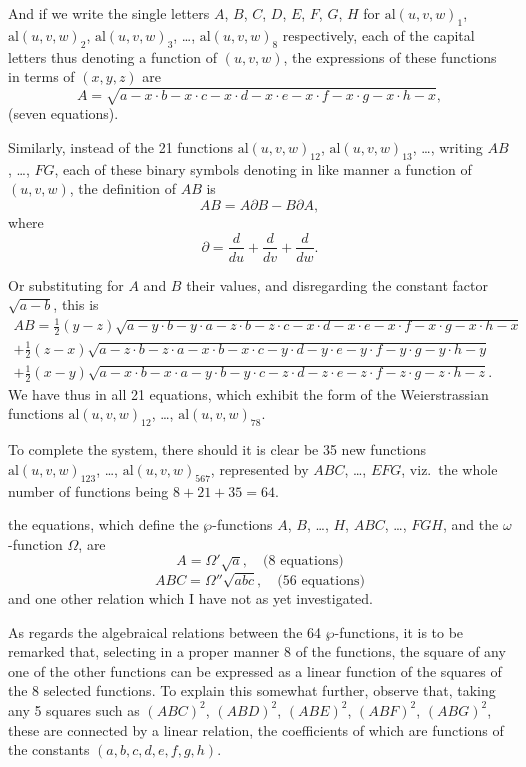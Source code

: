 \documentclass[11pt,a4paper]{book}
\begin{document}
And if we write the single letters $A$, $B$, $C$, $D$, $E$, $F$, $G$, $H$ for $\mathrm{al}(u, v, w)_1$, $\mathrm{al}(u, v, w)_2$, $\mathrm{al}(u, v, w)_3$, \dots, $\mathrm{al}(u, v, w)_8$ respectively, each of the capital letters thus denoting a function of $(u, v, w)$, the expressions of these functions in terms of $(x, y, z)$ are
\[
A = \sqrt{a - x \cdot b - x \cdot c - x \cdot d - x \cdot e - x \cdot f - x \cdot g - x \cdot h - x},
\]
(seven equations).

\clearpage
Similarly, instead of the 21 functions $\mathrm{al}(u, v, w)_{12}$, $\mathrm{al}(u, v, w)_{13}$, \dots, writing $AB$, \dots, $FG$, each of these binary symbols denoting in like manner a function of $(u, v, w)$, the definition of $AB$ is
\[
AB = A\partial B - B\partial A,
\]
where
\[
\partial = \frac{d}{du} + \frac{d}{dv} + \frac{d}{dw}.
\]

\clearpage
Or substituting for $A$ and $B$ their values, and disregarding the constant factor $\sqrt{a - b}$, this is
\begin{multline*}
AB = \tfrac{1}{2}(y - z)\sqrt{a - y \cdot b - y \cdot a - z \cdot b - z \cdot c - x \cdot d - x \cdot e - x \cdot f - x \cdot g - x \cdot h - x} \\
+ \tfrac{1}{2}(z - x)\sqrt{a - z \cdot b - z \cdot a - x \cdot b - x \cdot c - y \cdot d - y \cdot e - y \cdot f - y \cdot g - y \cdot h - y} \\
+ \tfrac{1}{2}(x - y)\sqrt{a - x \cdot b - x \cdot a - y \cdot b - y \cdot c - z \cdot d - z \cdot e - z \cdot f - z \cdot g - z \cdot h - z}.
\end{multline*}
We have thus in all 21 equations, which exhibit the form of the Weierstrassian functions $\mathrm{al}(u, v, w)_{12}$, \dots, $\mathrm{al}(u, v, w)_{78}$.

To complete the system, there should it is clear be 35 new functions $\mathrm{al}(u, v, w)_{123}$, \dots, $\mathrm{al}(u, v, w)_{567}$, represented by $ABC$, \dots, $EFG$, viz.\ the whole number of functions being $8 + 21 + 35 = 64$.

\clearpage
the equations, which define the $\wp$-functions $A$, $B$, \dots, $H$, $ABC$, \dots, $FGH$, and the $\omega$-function $\Omega$, are
\[
A = \Omega'\sqrt{a}, \quad \text{(8 equations)}
\]
\[
ABC = \Omega''\sqrt{abc}, \quad \text{(56 equations)}
\]
and one other relation which I have not as yet investigated.

As regards the algebraical relations between the 64 $\wp$-functions, it is to be remarked that, selecting in a proper manner 8 of the functions, the square of any one of the other functions can be expressed as a linear function of the squares of the 8 selected functions. To explain this somewhat further, observe that, taking any 5 squares such as $(ABC)^2$, $(ABD)^2$, $(ABE)^2$, $(ABF)^2$, $(ABG)^2$, these are connected by a linear relation, the coefficients of which are functions of the constants $(a, b, c, d, e, f, g, h)$.
\end{document}
